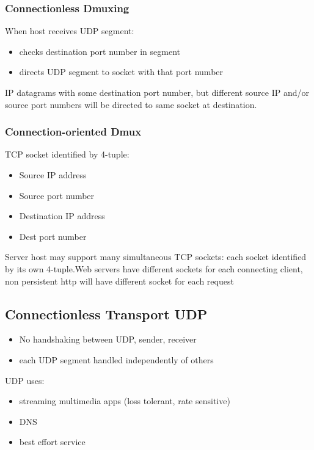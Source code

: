 \documentclass[11pt]{article}
\begin{document}
\subsubsection{Connectionless Dmuxing}
\label{sec:orgd770b20}
When host receives UDP segment:
\begin{itemize}
\item checks destination port number in segment
\item directs UDP segment to socket with that port number
\end{itemize}

IP datagrams with some destination port number, but different source IP
and/or source port numbers will be directed to same socket at destination.

\subsubsection{Connection-oriented Dmux}
\label{sec:org51b0fde}
TCP socket identified by 4-tuple:
\begin{itemize}
\item Source IP address
\item Source port number
\item Destination IP address
\item Dest port number
\end{itemize}

Server host may support many simultaneous TCP sockets: each socket
identified by its own 4-tuple.Web servers have different sockets for
each connecting client, non persistent http will have different socket
for each request

\subsection{Connectionless Transport UDP}
\label{sec:orgc5b0721}
\begin{itemize}
\item No handshaking between UDP, sender, receiver
\item each UDP segment handled independently of others
\end{itemize}

UDP uses:
\begin{itemize}
\item streaming multimedia apps (loss tolerant, rate sensitive)
\item DNS
\item best effort service
\end{itemize}
\end{document}
